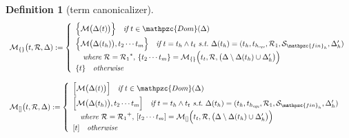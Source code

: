 \documentclass[12pt]{article}
\newtheorem{Definition}{Definition}[section]
\begin{document}
\begin{Definition}[term canonicalizer]
  \begin{displaymath}
    \begin{array}{l}
    \mathcal{M}_{\{\}}\bigl(t, \mathcal{R},\Delta) :=
     \left\{\begin{array}{l}
       \Bigl\{\mathcal{M}\bigl(\Delta(t) \bigr) \Bigr\}
        \quad \text{\it if}\ t \in \mathpzc{Dom}(\Delta)  \\ [5pt]
       \Bigl\{\mathcal{M}\bigl(\Delta(t_h) \bigr), t_2 \cdots t_m \Bigr\}
        \quad \text{\it if}\ t = t_h \wedge t_t\ \text{\it s.t.}\
         \Delta(t_h) = (t_h, t_{h_{\text{\it equ}}}, \mathcal{R}_1,
          \mathcal{S}_{\mathpzc{fin}_h}, \Delta'_h)  \\
       \quad \text{\it where}\ \mathcal{R} = {\mathcal{R}_1}^*,\,
        \{t_2 \cdots t_m\} =
         \mathcal{M}_{\{\}}\Bigl(t_t, \mathcal{R}, \bigl(\Delta \setminus
          \Delta(t_h) \cup \Delta'_h \bigr) \Bigr)  \\
       \{t\} \quad \text{\it otherwise}
     \end{array}\right.  \\
     \\
     
     \mathcal{M}_{[]}\bigl(t, \mathcal{R},\Delta) :=
     \left\{\begin{array}{l}
       \Bigl[\mathcal{M}\bigl(\Delta(t) \bigr) \Bigr]
        \quad \text{\it if}\ t \in \mathpzc{Dom}(\Delta)  \\ [5pt]
       \Bigl[\mathcal{M}\bigl(\Delta(t_h) \bigr), t_2 \cdots t_m \Bigr]
        \quad \text{\it if}\ t = t_h \wedge t_t\ \text{\it s.t.}\
         \Delta(t_h) = (t_h, t_{h_{\text{\it equ}}}, \mathcal{R}_1,
          \mathcal{S}_{\mathpzc{fin}_h}, \Delta'_h)  \\
       \quad \text{\it where}\ \mathcal{R} = {\mathcal{R}_1}^+,\,
        [t_2 \cdots t_m] =
         \mathcal{M}_{[]}\Bigl(t_t, \mathcal{R}, \bigl(\Delta \setminus
          \Delta(t_h) \cup \Delta'_h \bigr) \Bigr)  \\
       {[}t{]} \quad \text{\it otherwise}
     \end{array}\right.  \\
     \\
     

\end{array}
\end{displaymath}
\end{Definition}
\end{document}
